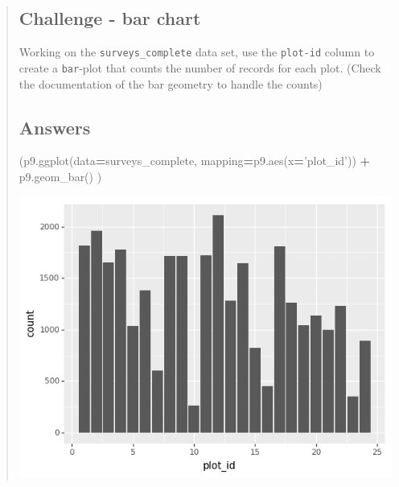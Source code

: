 \documentclass[
]{book}
\newenvironment{Shaded}{\begin{snugshade}}{\end{snugshade}}
\newcommand{\NormalTok}[1]{#1}
\newcommand{\OperatorTok}[1]{\textcolor[rgb]{0.81,0.36,0.00}{\textbf{#1}}}
\newcommand{\StringTok}[1]{\textcolor[rgb]{0.31,0.60,0.02}{#1}}
\begin{document}
\begin{quote}
\hypertarget{challenge---bar-chart}{%
\subsection*{Challenge - bar chart}\label{challenge---bar-chart}}

Working on the \texttt{surveys\_complete} data set, use the \texttt{plot-id} column to
create a \texttt{bar}-plot that counts the number of records for each plot. (Check
the documentation of the bar geometry to handle the counts)

\hypertarget{answers}{%
\subsection*{Answers}\label{answers}}

\begin{Shaded}
\begin{Highlighting}[]
\NormalTok{(p9.ggplot(data}\OperatorTok{=}\NormalTok{surveys_complete,}
\NormalTok{           mapping}\OperatorTok{=}\NormalTok{p9.aes(x}\OperatorTok{=}\StringTok{'plot_id'}\NormalTok{))}
    \OperatorTok{+}\NormalTok{ p9.geom_bar()}
\NormalTok{)}
\end{Highlighting}
\end{Shaded}

\includegraphics[width=8.01in]{./figures/python_barplot_example}
\end{quote}
\end{document}
